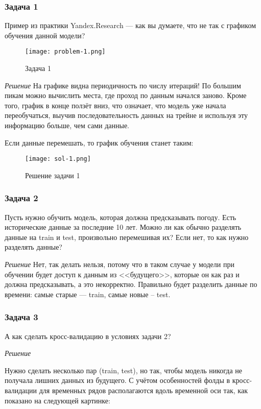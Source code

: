 \subsubsection{Задача 1}
Пример из практики Yandex.Research — как вы думаете, что не так с графиком обучения данной модели?

\begin{figure}[h]
	\centering
	\texttt{[image: problem-1.png]}
	\caption{Задача 1}
	\label{img:problem-1}
\end{figure}

\textit{Решение}
На графике видна периодичность по числу итераций! По большим пикам можно вычислить места, где проход по данным начался заново. Кроме того, график в конце ползёт вниз, что означает, что модель уже начала переобучаться, выучив последовательность данных на трейне и используя эту информацию больше, чем сами данные.

Если данные перемешать, то график обучения станет таким:

\begin{figure}[h]
	\centering
	\texttt{[image: sol-1.png]}
	\caption{Решение задачи 1}
	\label{img:sol-1}
\end{figure}

\subsubsection{Задача 2}

Пусть нужно обучить модель, которая должна предсказывать погоду. Есть исторические данные за последние 10 лет. Можно ли как обычно разделять данные на train и test, произвольно перемешивая их? Если нет, то как нужно разделять данные?

\textit{Решение}
Нет, так делать нельзя, потому что в таком случае у модели при обучении будет доступ к данным из <<будущего>>, которые он как раз и должна предсказывать, а это некорректно. Правильно будет разделить данные по времени: самые старые --- train, самые новые -- test.

\subsubsection{Задача 3}

А как сделать кросс-валидацию в условиях задачи 2?

\textit{Решение}

Нужно сделать несколько пар (train, test), но так, чтобы модель никогда не получала лишних данных из будущего. С учётом особенностей фолды в кросс-валидации для временных рядов располагаются вдоль временной оси так, как показано на следующей картинке:

